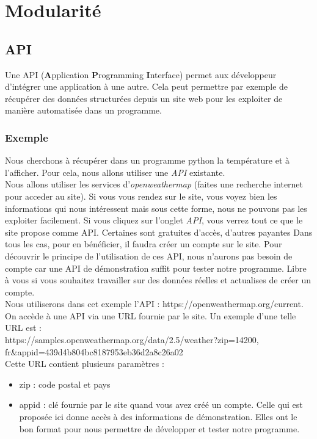 \documentclass[12pt,fleqn]{book} %
\begin{document}
\chapter*{Modularité}
\section{API}
\begin{definition}
	Une API (\textbf{A}pplication \textbf{P}rogramming \textbf{I}nterface) permet aux développeur d'intégrer une application à une autre. Cela peut permettre par exemple de récupérer des données structurées depuis un site web pour les exploiter de manière automatisée dans un programme. 
\end{definition}

\subsection{Exemple}
Nous cherchons à récupérer dans un programme python la température et à l'afficher. Pour cela, nous allons utiliser une \textit{API} existante.\\

Nous allons utiliser les services d'\textit{openweathermap} (faites une recherche internet pour acceder au site). Si vous vous rendez sur le site, vous voyez bien les informations qui nous intéressent mais sous cette forme, nous ne pouvons pas les exploiter facilement. Si vous cliquez sur l'onglet \textit{API}, vous verrez tout ce que le site propose comme API. Certaines sont gratuites d'accès, d'autres payantes Dans tous les cas, pour en bénéficier, il faudra créer un compte sur le site. Pour découvrir le principe de l'utilisation de ces API, nous n'aurons pas besoin de compte car une API de démonstration suffit pour tester notre programme. Libre à vous si vous souhaitez travailler sur des données réelles et actualises de créer un compte.\\ 

Nous utiliserons dans cet exemple l'API : https://openweathermap.org/current. \\

On accède à une API via une URL fournie par le site. Un exemple d'une telle URL est :\\ https://samples.openweathermap.org/data/2.5/weather?zip=14200,\\fr&appid=439d4b804bc8187953eb36d2a8c26a02 \\

Cette URL contient plusieurs paramètres : 
\begin{itemize}
	\item zip : code postal et pays
	\item appid : clé fournie par le site quand vous avez créé un compte. Celle qui est proposée ici donne accès à des informations de démonstration. Elles ont le bon format pour nous permettre de développer et tester notre programme.
\end{itemize}
\end{document}
